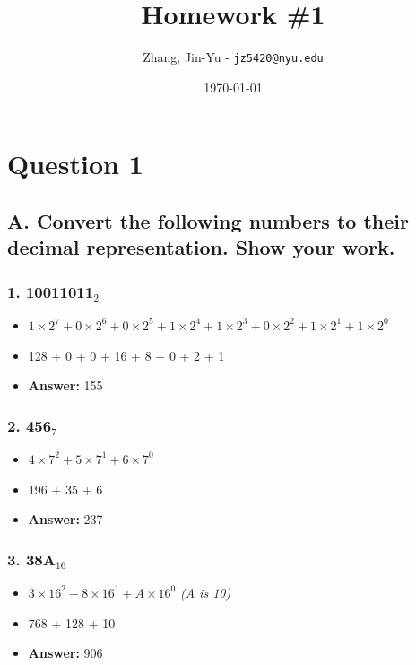 \documentclass[11pt, oneside]{article}
\title{Homework \#1}
\author{Zhang, Jin-Yu - \texttt{jz5420@nyu.edu}}
\date{\today}
\begin{document}
\maketitle

\pagebreak

\section*{Question 1}

\subsection*{A. Convert the following numbers to their decimal representation. Show your work.}

\subsubsection*{1. 10011011$_{2}$}

\begin{itemize}
    \item \(1\times2^7 + 0\times2^6 + 0\times2^5 + 1\times2^4 + 1\times2^3 + 0\times2^2 + 1\times2^1 + 1\times2^0\)
    \item 128 + 0 + 0 + 16 + 8 + 0 + 2 + 1
    \item \textbf{Answer:} 155
\end{itemize}

\subsubsection*{2. 456$_{7}$}

\begin{itemize}
    \item \(4\times7^2 + 5\times7^1 + 6\times7^0\)
    \item 196 + 35 + 6
    \item \textbf{Answer:} 237
\end{itemize}

\subsubsection*{3. 38A$_{16}$}

\begin{itemize}
    \item \(3\times16^2 + 8\times16^1 + A\times16^0\) \textit{(A is 10)}
    \item 768 + 128 + 10
    \item \textbf{Answer:} 906
\end{itemize}
\end{document}
